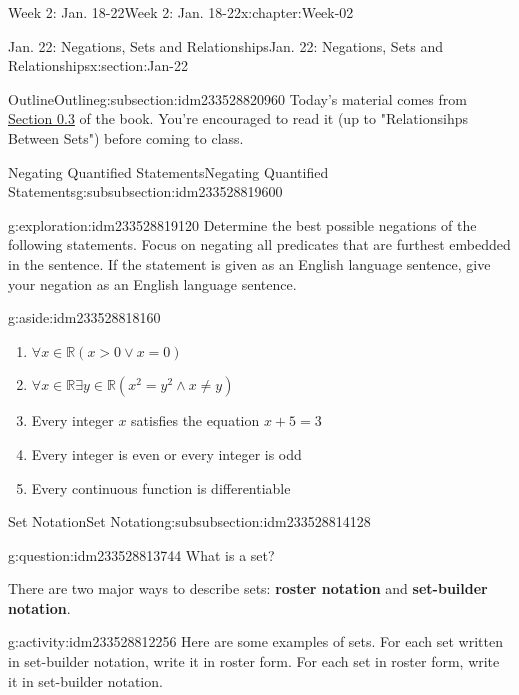 \documentclass[oneside,10pt,]{book}
\newcommand{\terminology}[1]{\textbf{#1}}
\numberwithin{equation}{section}
\def\R{{\mathbb R}}
\newcommand{\R}{\mathbb R}
\begin{document}
\begin{chapterptx}{Week 2: Jan. 18-22}{}{Week 2: Jan. 18-22}{}{}{x:chapter:Week-02}
\begin{sectionptx}{Jan. 22: Negations, Sets and Relationships}{}{Jan. 22: Negations, Sets and Relationships}{}{}{x:section:Jan-22}
%
\begin{subsectionptx}{Outline}{}{Outline}{}{}{g:subsection:idm233528820960}
Today's material comes from \href{http://discrete.openmathbooks.org/dmoi3/sec_intro-sets.html}{Section 0.3} of the book. You're encouraged to read it (up to "Relationsihps Between Sets") before coming to class.%
%
%
\typeout{************************************************}
\typeout{************************************************}
%
\begin{subsubsectionptx}{Negating Quantified Statements}{}{Negating Quantified Statements}{}{}{g:subsubsection:idm233528819600}
\begin{exploration}{}{g:exploration:idm233528819120}%
Determine the best possible negations of the following statements. Focus on negating all predicates that are furthest embedded in the sentence. If the statement is given as an English language sentence, give your negation as an English language sentence. \begin{aside}{}{g:aside:idm233528818160}%
\end{aside}
%
%
\begin{enumerate}
\item{}\(\displaystyle \forall x\in \R (x>0 \lor x = 0)\)%
\item{}\(\displaystyle \forall x\in \R \exists y\in \R (x^2 = y^2 \land x\ne y)\)%
\item{}Every integer \(x\) satisfies the equation \(x+5=3\)%
\item{}Every integer is even or every integer is odd%
\item{}Every continuous function is differentiable%
\end{enumerate}
\end{exploration}%
\end{subsubsectionptx}
%
%
\typeout{************************************************}
\typeout{************************************************}
%
\begin{subsubsectionptx}{Set Notation}{}{Set Notation}{}{}{g:subsubsection:idm233528814128}
\begin{question}{}{g:question:idm233528813744}%
What is a set?%
\end{question}
There are two major ways to describe sets: \terminology{roster notation} and \terminology{set-builder notation}.%
\begin{activity}{}{g:activity:idm233528812256}%
Here are some examples of sets. For each set written in set-builder notation, write it in roster form. For each set in roster form, write it in set-builder notation.%

\end{activity}
\end{subsubsectionptx}
\end{subsectionptx}
\end{sectionptx}
\end{chapterptx}
\end{document}
